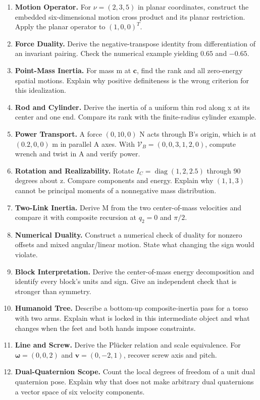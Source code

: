 \begin{enumerate}
\item \textbf{Motion Operator.} For $\nu=(2,3,5)$ in planar coordinates, construct the embedded six-dimensional motion cross product and its planar restriction. Apply the planar operator to $(1,0,0)^T$.
\item \textbf{Force Duality.} Derive the negative-transpose identity from differentiation of an invariant pairing. Check the numerical example yielding $0.65$ and $-0.65$.
\item \textbf{Point-Mass Inertia.} For mass m at $\mathbf c$, find the rank and all zero-energy spatial motions. Explain why positive definiteness is the wrong criterion for this idealization.
\item \textbf{Rod and Cylinder.} Derive the inertia of a uniform thin rod along x at its center and one end. Compare its rank with the finite-radius cylinder example.
\item \textbf{Power Transport.} A force $(0,10,0)$ N acts through B's origin, which is at $(0.2,0,0)$ m in parallel A axes. With $\mathcal V_B=(0,0,3,1,2,0)$, compute wrench and twist in A and verify power.
\item \textbf{Rotation and Realizability.} Rotate $I_C=\operatorname{diag}(1,2,2.5)$ through 90 degrees about z. Compare components and energy. Explain why $(1,1,3)$ cannot be principal moments of a nonnegative mass distribution.
\item \textbf{Two-Link Inertia.} Derive M from the two center-of-mass velocities and compare it with composite recursion at $q_2=0$ and $\pi/2$.
\item \textbf{Numerical Duality.} Construct a numerical check of duality for nonzero offsets and mixed angular/linear motion. State what changing the sign would violate.
\item \textbf{Block Interpretation.} Derive the center-of-mass energy decomposition and identify every block's units and sign. Give an independent check that is stronger than symmetry.
\item \textbf{Humanoid Tree.} Describe a bottom-up composite-inertia pass for a torso with two arms. Explain what is locked in this intermediate object and what changes when the feet and both hands impose constraints.
\item \textbf{Line and Screw.} Derive the Pl\"ucker relation and scale equivalence. For $\boldsymbol\omega=(0,0,2)$ and $\mathbf v=(0,-2,1)$, recover screw axis and pitch.
\item \textbf{Dual-Quaternion Scope.} Count the local degrees of freedom of a unit dual quaternion pose. Explain why that does not make arbitrary dual quaternions a vector space of six velocity components.

\end{enumerate}

